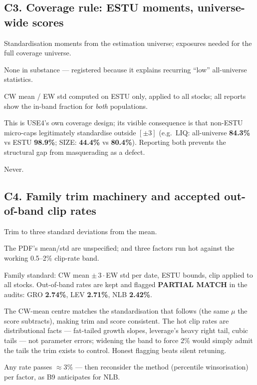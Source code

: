 \documentclass[11pt,a4paper]{article}
\newcommand{\WARN}[1]{\textcolor{warn}{\textbf{#1}}}
\begin{document}
\subsection{C3. Coverage rule: ESTU moments, universe-wide scores}

\begin{description}[style=nextline]
  \item[USE4] Standardisation moments from the estimation universe; exposures
    needed for the full coverage universe.
  \item[Deviation] None in substance --- registered because it explains
    recurring ``low'' all-universe statistics.
  \item[Solution] CW mean / EW std computed on ESTU only, applied to all
    stocks; all reports show the in-band fraction for \emph{both} populations.
  \item[Validity] This is USE4's own coverage design; its visible consequence
    is that non-ESTU micro-caps legitimately standardise outside $[\pm 3]$
    (e.g.\ LIQ: all-universe \textbf{84.3\%} vs ESTU \textbf{98.9\%}; SIZE:
    \textbf{44.4\%} vs \textbf{80.4\%}). Reporting both prevents the
    structural gap from masquerading as a defect.
  \item[Revisit when] Never.
\end{description}

\subsection{C4. Family trim machinery and accepted out-of-band clip rates}

\begin{description}[style=nextline]
  \item[USE4] Trim to three standard deviations from the mean.
  \item[Deviation] The PDF's mean/std are unspecified; and three factors run
    hot against the working 0.5--2\% clip-rate band.
  \item[Solution] Family standard: CW mean $\pm\,3\cdot$EW std per date, ESTU
    bounds, clip applied to all stocks. Out-of-band rates are kept and flagged
    \WARN{PARTIAL MATCH} in the audits: GRO \textbf{2.74\%}, LEV
    \textbf{2.71\%}, NLB \textbf{2.42\%}.
  \item[Validity] The CW-mean centre matches the standardisation that follows
    (the same $\mu$ the score subtracts), making trim and score consistent.
    The hot clip rates are distributional facts --- fat-tailed growth slopes,
    leverage's heavy right tail, cubic tails --- not parameter errors;
    widening the band to force 2\% would simply admit the tails the trim
    exists to control. Honest flagging beats silent retuning.
  \item[Revisit when] Any rate passes $\approx 3\%$ --- then reconsider the
    method (percentile winsorisation) per factor, as B9 anticipates for NLB.
\end{description}
\end{document}
